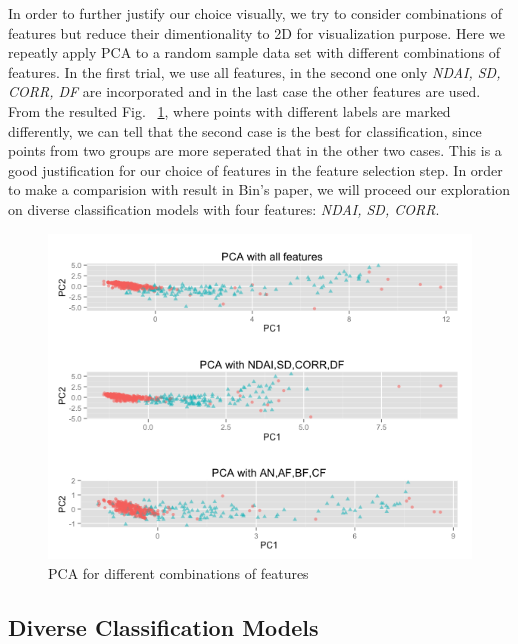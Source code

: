 \documentclass[english]{article}\usepackage{graphicx, color}
\numberwithin{equation}{section}
\numberwithin{figure}{section}
\begin{document}
In order to further justify our choice visually, we try to consider combinations
of features but reduce their dimentionality to 2D for visualization purpose. 
Here we repeatly apply PCA to a random sample data set with different 
combinations of features. In the first trial, we use all features, in the second 
one only \textit{NDAI, SD, CORR, DF} are incorporated and in the last case 
the other features are used. From the resulted Fig. ~\ref{fig:PCA}, where 
points with different labels are marked differently, we can tell that the second 
case is the best for classification, since points from two groups are more 
seperated that in the other two cases. This is a good justification for our 
choice of features in the feature selection step. In order to make a comparision 
with result in Bin's paper,  we will proceed our exploration on diverse 
classification models with four features: \textit{NDAI, SD, CORR}.

\begin{figure}[!h]
  \begin{center}
    \includegraphics[width=\columnwidth]{figures/PCA_selection.png}
  \end{center}
  \caption{PCA for different combinations of features}
  \label{fig:PCA}
\end{figure}


\subsection{Diverse Classification Models}
\end{document}
